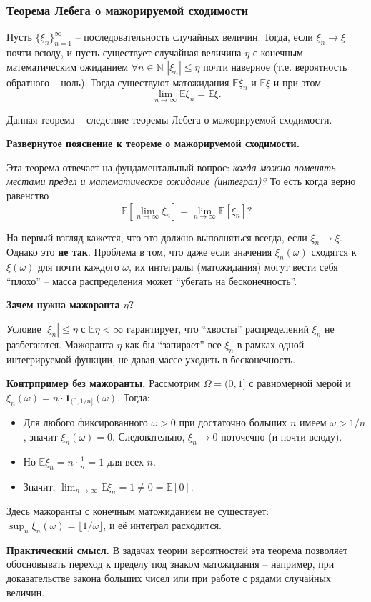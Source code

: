 \subsubsection{Теорема Лебега о мажорируемой сходимости}
\begin{theorem}
Пусть $\{\xi_n\}_{n=1}^{\infty}$ -- последовательность случайных величин. Тогда, если $\xi_n \to \xi$ почти всюду, и пусть существует случайная величина $\eta$ с конечным математическим ожиданием $\forall n \in \mathbb{N}$ $|\xi_n| \leqslant \eta$ почти наверное (т.е. вероятность обратного -- ноль). Тогда существуют матожидания $\mathbb{E}\xi_n$ и $\mathbb{E}\xi$ и при этом
\[
\lim_{n \to \infty} \mathbb{E}\xi_n = \mathbb{E}\xi.
\]
\end{theorem}

Данная теорема -- следствие теоремы Лебега о мажорируемой сходимости.

\begin{notice}
\textbf{Развернутое пояснение к теореме о мажорируемой сходимости.}

Эта теорема отвечает на фундаментальный вопрос: \textit{когда можно поменять местами предел и математическое ожидание (интеграл)?} То есть когда верно равенство
\[
\mathbb{E}\!\left[\lim_{n \to \infty} \xi_n\right] = \lim_{n \to \infty} \mathbb{E}[\xi_n]?
\]

На первый взгляд кажется, что это должно выполняться всегда, если $\xi_n \to \xi$. Однако это \textbf{не так}. Проблема в том, что даже если значения $\xi_n(\omega)$ сходятся к $\xi(\omega)$ для почти каждого $\omega$, их интегралы (матожидания) могут вести себя ``плохо'' -- масса распределения может ``убегать на бесконечность''.

\textbf{Зачем нужна мажоранта $\eta$?}

Условие $|\xi_n| \leqslant \eta$ с $\mathbb{E}\eta < \infty$ гарантирует, что ``хвосты'' распределений $\xi_n$ не разбегаются. Мажоранта $\eta$ как бы ``запирает'' все $\xi_n$ в рамках одной интегрируемой функции, не давая массе уходить в бесконечность.

\textbf{Контрпример без мажоранты.} Рассмотрим $\Omega = (0, 1]$ с равномерной мерой и $\xi_n(\omega) = n \cdot \mathbf{1}_{(0, 1/n]}(\omega)$. Тогда:
\begin{itemize}
    \item Для любого фиксированного $\omega > 0$ при достаточно больших $n$ имеем $\omega > 1/n$, значит $\xi_n(\omega) = 0$. Следовательно, $\xi_n \to 0$ поточечно (и почти всюду).
    \item Но $\mathbb{E}\xi_n = n \cdot \frac{1}{n} = 1$ для всех $n$.
    \item Значит, $\lim_{n \to \infty} \mathbb{E}\xi_n = 1 \neq 0 = \mathbb{E}[0]$.
\end{itemize}
Здесь мажоранты с конечным матожиданием не существует: $\sup_n \xi_n(\omega) = \lfloor 1/\omega \rfloor$, и её интеграл расходится.

\textbf{Практический смысл.} В задачах теории вероятностей эта теорема позволяет обосновывать переход к пределу под знаком матожидания -- например, при доказательстве закона больших чисел или при работе с рядами случайных величин.
\end{notice}

